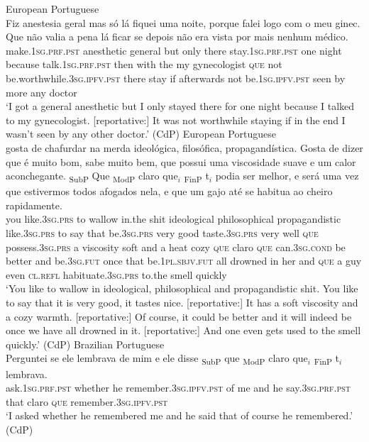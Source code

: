 \ea\label{ex:ptqrep}
 European Portuguese \\
\gll
Fiz anestesia geral mas só lá fiquei uma noite, porque falei logo com o meu ginec. Que não {valia a pena} lá ficar se depois não era vista por mais nenhum médico.\\
make.\textsc{1sg.prf.pst} anesthetic general  but only there stay.\textsc{1sg.prf.pst} one night because talk.\textsc{1sg.prf.pst} then with the my gynecologist \textsc{que} not be.worthwhile.\textsc{3sg.ipfv.pst} there stay if afterwards not be.\textsc{1sg.ipfv.pst} seen by more any doctor\\
\glt `I got a general anesthetic but I only stayed there for one night because I  talked to my gynecologist. [reportative:]  It was not worthwhile staying if in the end I wasn't seen by any other doctor.' (CdP)
\ex\label{ex:highqpt}
\ea\label{ex:highqpta}
 European  Portuguese \\
 gosta de chafurdar na merda ideológica, filosófica, propagandística. Gosta de dizer que é muito bom, sabe muito bem, que possui uma viscosidade suave e um calor aconchegante. {\ob}\textsubscript{SubP} Que{\cb}  {\ob}\textsubscript{ModP} claro que$_i${\cb} {\ob}\textsubscript{FinP} t$_i${\cb} podia ser melhor, e será {uma vez} que estivermos todos afogados nela, e que um gajo até se habitua ao cheiro rapidamente. \\
you like.\textsc{3sg.prs} to wallow in.the shit ideological philosophical propagandistic like.\textsc{3sg.prs} to say that be.\textsc{3sg.prs} very good taste.\textsc{3sg.prs} very well \textsc{que} possess.\textsc{3sg.prs} a viscosity soft and a heat cozy {} \textsc{que} {} claro \textsc{que} {} {}  can.\textsc{3sg.cond} be better and be.\textsc{3sg.fut} once that be.\textsc{1pl.sbjv.fut} all drowned {in her} and \textsc{que} a guy even \textsc{cl.refl} habituate.\textsc{3sg.prs} to.the smell quickly\\
\glt `You like to wallow in ideological, philosophical and propagandistic shit. You like to say that it is very good, it tastes nice. [reportative:]  It has a soft viscosity and a cozy warmth.  [reportative:] Of course, it could be better and it will indeed be once we have all drowned in it. [reportative:] And one even gets used to the smell quickly.' (CdP)
\ex\label{ex:highqptb}
 Brazilian Portuguese \\
\gll Perguntei se ele lembrava de mim e ele disse {\ob}\textsubscript{SubP} que{\cb}  {\ob}\textsubscript{ModP} claro que$_i${\cb} {\ob}\textsubscript{FinP} t$_i${\cb} lembrava.  \\
ask.\textsc{1sg.prf.pst} whether he remember.\textsc{3sg.ipfv.pst}  of me and he say.\textsc{3sg.prf.pst} {}  that {} claro \textsc{que} {} {} remember.\textsc{3sg.ipfv.pst}\\
\glt `I asked whether he remembered me and he said that of course he remembered.' (CdP)
\z
\z

